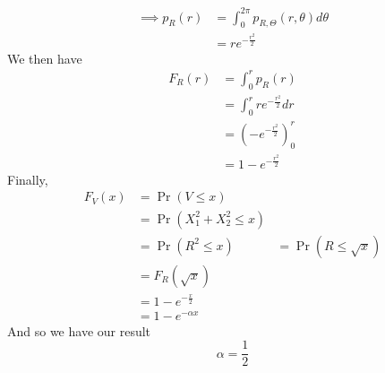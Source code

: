 \documentclass[journal, 12pt, twocolumn]{IEEEtran}
\providecommand{\pr}[1]{\ensuremath{\Pr\left(#1\right)}}
\begin{document}
\begin{enumerate}[label=\arabic{section}.\arabic*]
\begin{align}
            \implies p_{R}(r) &= \int_{0}^{2 \pi} p_{R, \Theta}(r, \theta) d \theta \\
            &= r e^{-{\frac{r^2}{2}}}
        \end{align}
        We then have
        \begin{align}
            F_R(r) &= \int_{0}^{r} p_R(r) \\
            &= \int_{0}^{r} r e^{-\frac{r^2}{2}} dr \\
            &= \left(-e^{-\frac{r^2}{2}}\right)_{0}^{r} \\
            &= 1 - e^{-\frac{r^2}{2}}
        \end{align}
        Finally,
        \begin{align}
            F_V(x) &= \pr{V \leq x} \\
            &= \pr{X_1^2 + X_2^2 \leq x} \\
            &= \pr{R^2 \leq x}
            &= \pr{R \leq \sqrt{x}} \\
            &= F_R(\sqrt{x}) \\
            &= 1 - e^{-\frac{x}{2}} \\
            &= 1 - e^{- \alpha x}
        \end{align}
        And so we have our result
        \begin{equation}
            \alpha = \frac{1}{2}
        \end{equation}


\end{enumerate}
\end{document}
